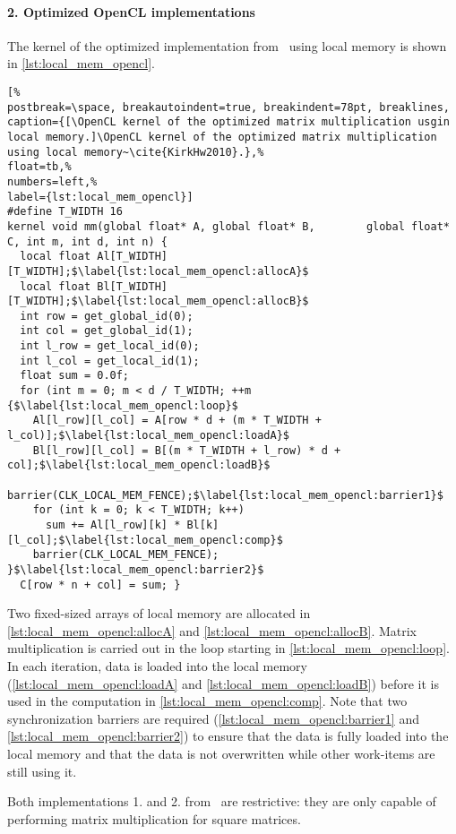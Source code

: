 \paragraph{2. Optimized OpenCL implementations}
The kernel of the optimized \OpenCL implementation from~\cite{KirkHw2010} using local memory is shown in \autoref{lst:local_mem_opencl}.
\begin{lstlisting}[%                                                             
postbreak=\space, breakautoindent=true, breakindent=78pt, breaklines,
caption={[\OpenCL kernel of the optimized matrix multiplication usgin local memory.]\OpenCL kernel of the optimized matrix multiplication using local memory~\cite{KirkHw2010}.},%
float=tb,%
numbers=left,%
label={lst:local_mem_opencl}]
#define T_WIDTH 16
kernel void mm(global float* A, global float* B,        global float* C, int m, int d, int n) {
  local float Al[T_WIDTH][T_WIDTH];$\label{lst:local_mem_opencl:allocA}$
  local float Bl[T_WIDTH][T_WIDTH];$\label{lst:local_mem_opencl:allocB}$
  int row = get_global_id(0);
  int col = get_global_id(1);
  int l_row = get_local_id(0);
  int l_col = get_local_id(1);
  float sum = 0.0f;
  for (int m = 0; m < d / T_WIDTH; ++m {$\label{lst:local_mem_opencl:loop}$
    Al[l_row][l_col] = A[row * d + (m * T_WIDTH + l_col)];$\label{lst:local_mem_opencl:loadA}$
    Bl[l_row][l_col] = B[(m * T_WIDTH + l_row) * d + col];$\label{lst:local_mem_opencl:loadB}$
    barrier(CLK_LOCAL_MEM_FENCE);$\label{lst:local_mem_opencl:barrier1}$
    for (int k = 0; k < T_WIDTH; k++)
      sum += Al[l_row][k] * Bl[k][l_col];$\label{lst:local_mem_opencl:comp}$
    barrier(CLK_LOCAL_MEM_FENCE); }$\label{lst:local_mem_opencl:barrier2}$
  C[row * n + col] = sum; }
\end{lstlisting}
Two fixed-sized arrays of local memory are allocated in \autoref{lst:local_mem_opencl:allocA} and \autoref{lst:local_mem_opencl:allocB}.
Matrix multiplication is carried out in the loop starting in \autoref{lst:local_mem_opencl:loop}.
In each iteration, data is loaded into the local memory (\autoref{lst:local_mem_opencl:loadA} and \autoref{lst:local_mem_opencl:loadB}) before it is used in the computation in \autoref{lst:local_mem_opencl:comp}.
Note that two synchronization barriers are required (\autoref{lst:local_mem_opencl:barrier1} and \autoref{lst:local_mem_opencl:barrier2}) to ensure that the data is fully loaded into the local memory and that the data is not overwritten while other work-items are still using it.

Both \OpenCL implementations 1. and 2. from~\cite{KirkHw2010} are restrictive:
they are only capable of performing matrix multiplication for square matrices.

